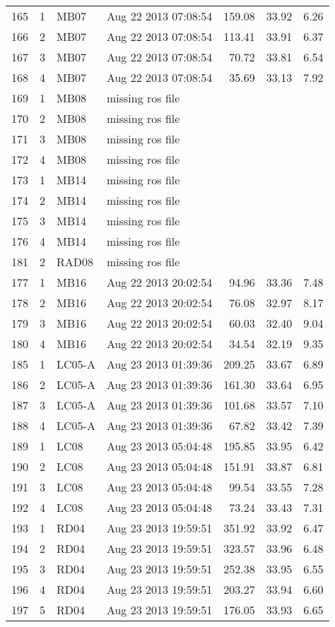 \begin{longtable}{ccllrrr}
\hline 
165&1&MB07&Aug 22 2013 07:08:54&159.08&33.92&6.26\\
166&2&MB07&Aug 22 2013 07:08:54&113.41&33.91&6.37\\
167&3&MB07&Aug 22 2013 07:08:54&70.72&33.81&6.54\\
168&4&MB07&Aug 22 2013 07:08:54&35.69&33.13&7.92\\
\hline 
169&1&MB08&missing ros file&&&\\
170&2&MB08&missing ros file&&&\\
171&3&MB08&missing ros file&&&\\
172&4&MB08&missing ros file&&&\\
\hline 
173&1&MB14&missing ros file&&&\\
174&2&MB14&missing ros file&&&\\
175&3&MB14&missing ros file&&&\\
176&4&MB14&missing ros file&&&\\
\hline 
181&2&RAD08&missing ros file&&&\\
\hline 
177&1&MB16&Aug 22 2013 20:02:54&94.96&33.36&7.48\\
178&2&MB16&Aug 22 2013 20:02:54&76.08&32.97&8.17\\
179&3&MB16&Aug 22 2013 20:02:54&60.03&32.40&9.04\\
180&4&MB16&Aug 22 2013 20:02:54&34.54&32.19&9.35\\
\hline 
185&1&LC05-A&Aug 23 2013 01:39:36&209.25&33.67&6.89\\
186&2&LC05-A&Aug 23 2013 01:39:36&161.30&33.64&6.95\\
187&3&LC05-A&Aug 23 2013 01:39:36&101.68&33.57&7.10\\
188&4&LC05-A&Aug 23 2013 01:39:36&67.82&33.42&7.39\\
\hline 
189&1&LC08&Aug 23 2013 05:04:48&195.85&33.95&6.42\\
190&2&LC08&Aug 23 2013 05:04:48&151.91&33.87&6.81\\
191&3&LC08&Aug 23 2013 05:04:48&99.54&33.55&7.28\\
192&4&LC08&Aug 23 2013 05:04:48&73.24&33.43&7.31\\
\hline 
193&1&RD04&Aug 23 2013 19:59:51&351.92&33.92&6.47\\
194&2&RD04&Aug 23 2013 19:59:51&323.57&33.96&6.48\\
195&3&RD04&Aug 23 2013 19:59:51&252.38&33.95&6.55\\
196&4&RD04&Aug 23 2013 19:59:51&203.27&33.94&6.60\\
197&5&RD04&Aug 23 2013 19:59:51&176.05&33.93&6.65\\

\end{longtable}
